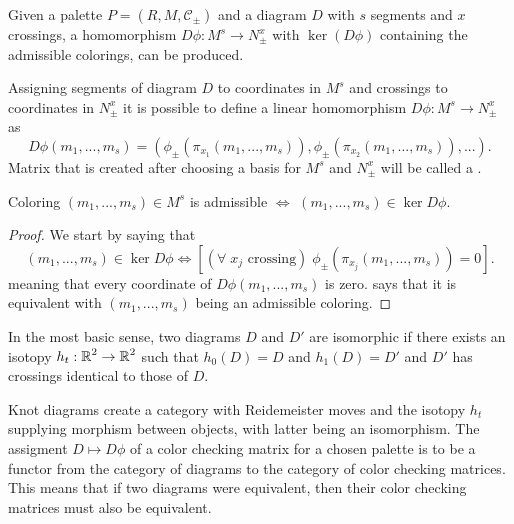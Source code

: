 Given a palette $P=(R, M, \mathcal{C}_\pm)$ and a diagram $D$ with $s$ segments and $x$ crossings, a homomorphism $D\phi:M^s\to N_\pm^x$ with $\ker(D\phi)$ containing the admissible colorings, can be produced.

\begin{definition}\label{def:color checking matrix}
  Assigning segments of diagram $D$ to coordinates in $M^s$ and crossings to coordinates in $N_\pm^x$ it is possible to define a linear homomorphism $D\phi:M^s\to N_\pm^x$  as
  $$D\phi(m_1,...,m_s)=(\phi_\pm(\pi_{x_1}(m_1,...,m_s)), \phi_\pm(\pi_{x_2}(m_1,...,m_s)),...).$$
  Matrix that is created after choosing a basis for $M^s$ and $N_\pm^x$ will be called a .
\end{definition}


\begin{proposition}\label{admissible coloring is kernel}
  Coloring $(m_1,...,m_s)\in M^s$ is admissible $\iff$ $(m_1,...,m_s)\in\ker D\phi$.
\end{proposition}

\begin{proof}
  We start by saying that 
  $$(m_1,..., m_s)\in\ker D\phi\iff [(\forall\;x_j\text{ crossing})\;\phi_\pm(\pi_{x_j}(m_1,..., m_s))=0].$$
  meaning that every coordinate of $D\phi(m_1,..., m_s)$ is zero.  says that it is equivalent with $(m_1,..., m_s)$ being an admissible coloring.
\end{proof}

In the most basic sense, two diagrams $D$ and $D'$ are isomorphic if there exists an isotopy $h_t:\operatorname{\mathbb{R}}^2\to \operatorname{\mathbb{R}}^2$ such that $h_0(D)=D$ and $h_1(D)=D'$ and $D'$ has crossings identical to those of $D$.

Knot diagrams create a category with Reidemeister moves and the isotopy $h_t$ supplying morphism between objects, with latter being an isomorphism. The assigment $D\mapsto D\phi$ of a color checking matrix for a chosen palette is to be a functor from the category of diagrams to the category of color checking matrices. This means that if two diagrams were equivalent, then their color checking matrices must also be equivalent.

